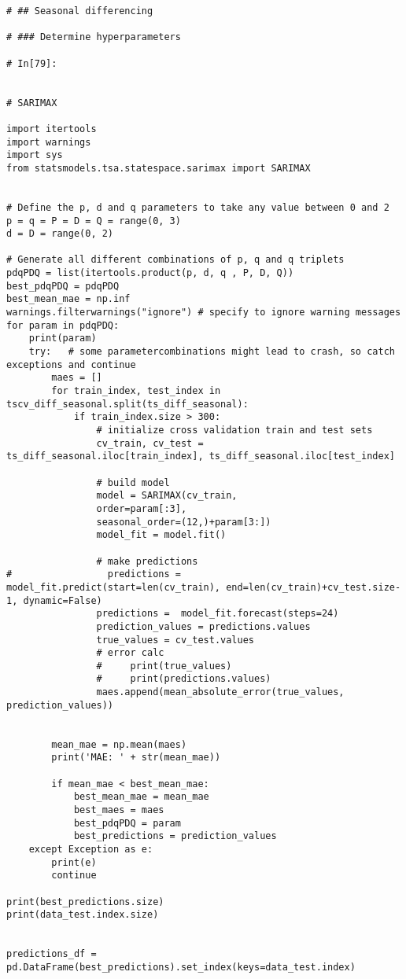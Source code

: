 \begin{verbatim}
# ## Seasonal differencing

# ### Determine hyperparameters

# In[79]:


# SARIMAX

import itertools
import warnings
import sys
from statsmodels.tsa.statespace.sarimax import SARIMAX


# Define the p, d and q parameters to take any value between 0 and 2
p = q = P = D = Q = range(0, 3)
d = D = range(0, 2)

# Generate all different combinations of p, q and q triplets
pdqPDQ = list(itertools.product(p, d, q , P, D, Q))
best_pdqPDQ = pdqPDQ
best_mean_mae = np.inf
warnings.filterwarnings("ignore") # specify to ignore warning messages
for param in pdqPDQ:
    print(param)
    try:   # some parametercombinations might lead to crash, so catch exceptions and continue
        maes = []
        for train_index, test_index in tscv_diff_seasonal.split(ts_diff_seasonal):
            if train_index.size > 300:
                # initialize cross validation train and test sets
                cv_train, cv_test = ts_diff_seasonal.iloc[train_index], ts_diff_seasonal.iloc[test_index]

                # build model
                model = SARIMAX(cv_train, 
                order=param[:3], 
                seasonal_order=(12,)+param[3:])
                model_fit = model.fit()

                # make predictions
#                 predictions =  model_fit.predict(start=len(cv_train), end=len(cv_train)+cv_test.size-1, dynamic=False)
                predictions =  model_fit.forecast(steps=24)
                prediction_values = predictions.values
                true_values = cv_test.values
                # error calc
                #     print(true_values)
                #     print(predictions.values)
                maes.append(mean_absolute_error(true_values, prediction_values))

        
        mean_mae = np.mean(maes)
        print('MAE: ' + str(mean_mae))    

        if mean_mae < best_mean_mae:
            best_mean_mae = mean_mae
            best_maes = maes
            best_pdqPDQ = param
            best_predictions = prediction_values
    except Exception as e:
        print(e)
        continue

print(best_predictions.size)
print(data_test.index.size)

        
predictions_df = pd.DataFrame(best_predictions).set_index(keys=data_test.index)


\end{verbatim}
